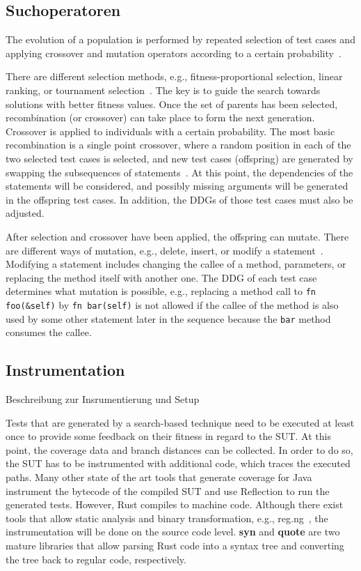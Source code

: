 \documentclass{article}
\begin{document}
\subsection{Suchoperatoren}
The evolution of a population is performed by repeated selection of test cases and applying crossover and mutation operators according to a certain probability~\cite{Fraser2012}.

There are different selection methods, e.g., fitness-proportional selection, linear ranking, or tournament selection~\cite{McMinn_2004}. The key is to guide the search towards solutions with better fitness values. Once the set of parents has been selected, recombination (or crossover) can take place to form the next generation. Crossover is applied to individuals with a certain probability. The most basic recombination is a single point crossover, where a random position in each of the two selected test cases is selected, and new test cases (offspring) are generated by swapping the subsequences of statements~\cite{Fraser2012}. At this point, the dependencies of the statements will be considered, and possibly missing arguments will be generated in the offspring test cases. In addition, the \acp{DDG} of those test cases must also be adjusted.

After selection and crossover have been applied, the offspring can mutate. There are different ways of mutation, e.g., delete, insert, or modify a statement~\cite{Fraser2012}. Modifying a statement includes changing the callee of a method, parameters, or replacing the method itself with another one. The \ac{DDG} of each test case determines what mutation is possible, e.g., replacing a method call to \lstinline{fn foo(&self)} by \lstinline{fn bar(self)} is not allowed if the callee of the method is also used by some other statement later in the sequence because the \lstinline{bar} method consumes the callee. 


\subsection{Instrumentation}
Beschreibung zur Insrumentierung und Setup~\cite{Fraser2012}

Tests that are generated by a search-based technique need to be executed at least once to provide some feedback on their fitness in regard to the \ac{SUT}. At this point, the coverage data and branch distances can be collected. In order to do so, the \ac{SUT} has to be instrumented with additional code, which traces the executed paths. Many other state of the art tools that generate coverage for Java instrument the bytecode of the compiled \ac{SUT} and use Reflection to run the generated tests. However, Rust compiles to machine code. Although there exist tools that allow static analysis and binary transformation, e.g., reg.ng~\cite{DiFederico2018}, the instrumentation will be done on the source code level. \textbf{syn} and \textbf{quote} are two mature libraries that allow parsing Rust code into a syntax tree and converting the tree back to regular code, respectively. 
\end{document}
